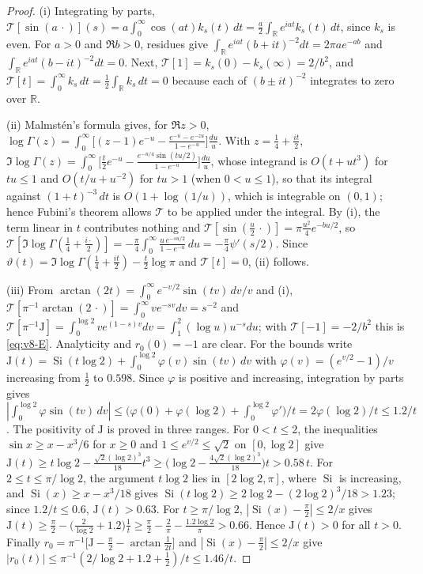\documentclass[11pt,a4paper]{article}
\numberwithin{equation}{section}
\theoremstyle{definition}
\theoremstyle{remark}
\begin{document}
\begin{proof}
(i) Integrating by parts,
$\mathcal T[\sin(a\,\cdot)](s)=a\int_0^\infty\cos(at)k_s(t)\,dt
=\frac a2\int_{\mathbb R}e^{iat}k_s(t)\,dt$, since $k_s$ is even.
For $a>0$ and $\Re b>0$, residues give
$\int_{\mathbb R}e^{iat}(b+it)^{-2}dt=2\pi ae^{-ab}$ and
$\int_{\mathbb R}e^{iat}(b-it)^{-2}dt=0$. Next,
$\mathcal T[1]=k_s(0)-k_s(\infty)=2/b^2$, and
$\mathcal T[t]=\int_0^\infty k_s\,dt=\frac12\int_{\mathbb R}k_s\,dt=0$
because each of $(b\pm it)^{-2}$ integrates to zero over $\mathbb R$.

(ii) Malmst\'en's formula gives, for $\Re z>0$,
$\log\Gamma(z)=\int_0^\infty\bigl[(z-1)e^{-u}
-\frac{e^{-u}-e^{-zu}}{1-e^{-u}}\bigr]\frac{du}u$. With
$z=\frac14+\frac{it}2$,
$\Im\log\Gamma(z)=\int_0^\infty\bigl[\frac t2e^{-u}
-\frac{e^{-u/4}\sin(tu/2)}{1-e^{-u}}\bigr]\frac{du}u$,
whose integrand is $O(t+ut^3)$ for $tu\le1$ and $O(t/u+u^{-2})$ for $tu>1$ (when $0<u\le1$), so that its integral against $(1+t)^{-3}\,dt$ is $O(1+\log(1/u))$, which is integrable on $(0,1)$; hence Fubini's theorem
allows $\mathcal T$ to be applied under the integral. By (i),
the term linear in $t$ contributes nothing and
$\mathcal T[\sin(\tfrac u2\,\cdot)]=\pi\tfrac{u^2}4e^{-bu/2}$, so
$\mathcal T[\Im\log\Gamma(\tfrac14+\tfrac{i\cdot}2)]
=-\frac\pi4\int_0^\infty\frac{u\,e^{-su/2}}{1-e^{-u}}\,du
=-\frac\pi4\psi'(s/2)$. Since
$\vartheta(t)=\Im\log\Gamma(\frac14+\frac{it}2)-\frac t2\log\pi$ and
$\mathcal T[t]=0$, (ii) follows.

(iii) From $\arctan(2t)=\int_0^\infty e^{-v/2}\sin(tv)\,dv/v$ and (i),
$\mathcal T[\pi^{-1}\arctan(2\,\cdot)]=\int_0^\infty ve^{-sv}dv=s^{-2}$
and $\mathcal T[\pi^{-1}\mathrm J]=\int_0^{\log2}ve^{(1-s)v}dv
=\int_1^2(\log u)u^{-s}du$; with $\mathcal T[-1]=-2/b^2$ this is
\eqref{eq:v8-E}. Analyticity and $r_0(0)=-1$ are clear. For the
bounds write $\mathrm J(t)=\operatorname{Si}(t\log2)+\int_0^{\log2}\varphi(v)\sin(tv)\,dv$
with $\varphi(v)=(e^{v/2}-1)/v$ increasing from $\frac12$ to $0.598$.
Since $\varphi$ is positive and increasing, integration by parts gives $|\int_0^{\log2}\varphi\sin(tv)\,dv|\le\bigl(\varphi(0)+\varphi(\log2)+\int_0^{\log2}\varphi'\bigr)/t=2\varphi(\log2)/t\le1.2/t$.
The positivity of $\mathrm J$ is proved in three ranges. For $0<t\le2$, the inequalities $\sin x\ge x-x^3/6$ for $x\ge0$ and $1\le e^{v/2}\le\sqrt2$ on $[0,\log2]$ give $\mathrm J(t)\ge t\log2-\frac{\sqrt2(\log2)^3}{18}t^3\ge\bigl(\log2-\frac{4\sqrt2(\log2)^3}{18}\bigr)t>0.58\,t$. For $2\le t\le\pi/\log2$, the argument $t\log2$ lies in $[2\log2,\pi]$, where $\operatorname{Si}$ is increasing, and $\operatorname{Si}(x)\ge x-x^3/18$ gives $\operatorname{Si}(t\log2)\ge2\log2-(2\log2)^3/18>1.23$; since $1.2/t\le0.6$, $\mathrm J(t)>0.63$. For $t\ge\pi/\log2$, $|\operatorname{Si}(x)-\frac\pi2|\le2/x$ gives $\mathrm J(t)\ge\frac\pi2-\bigl(\frac2{\log2}+1.2\bigr)\frac1t\ge\frac\pi2-\frac2\pi-\frac{1.2\log2}\pi>0.66$. Hence $\mathrm J(t)>0$ for all $t>0$.
Finally $r_0=\pi^{-1}\bigl[\mathrm J-\frac\pi2-\arctan\frac1{2t}\bigr]$ and
$|\operatorname{Si}(x)-\frac\pi2|\le2/x$ give
$|r_0(t)|\le\pi^{-1}(2/\log2+1.2+\tfrac12)/t\le1.46/t$.


\end{proof}
\end{document}
